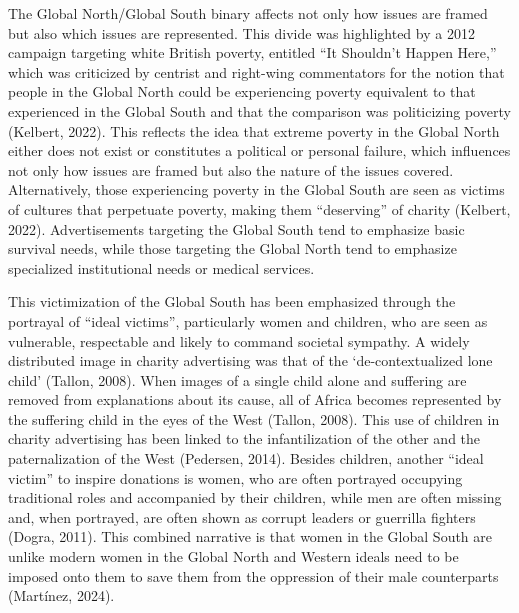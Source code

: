 The Global North/Global South binary affects not only how issues are framed but also which issues are represented. This divide was highlighted by a 2012 campaign targeting white British poverty, entitled “It Shouldn’t Happen Here,” which was criticized by centrist and right-wing commentators for the notion that people in the Global North could be experiencing poverty equivalent to that experienced in the Global South and that the comparison was politicizing poverty (Kelbert, 2022). This reflects the idea that extreme poverty in the Global North either does not exist or constitutes a political or personal failure, which influences not only how issues are framed but also the nature of the issues covered. Alternatively, those experiencing poverty in the Global South are seen as victims of cultures that perpetuate poverty, making them “deserving” of charity (Kelbert, 2022). Advertisements targeting the Global South tend to emphasize basic survival needs, while those targeting the Global North tend to emphasize specialized institutional needs or medical services.

This victimization of the Global South has been emphasized through the portrayal of “ideal victims”, particularly women and children, who are seen as vulnerable, respectable and likely to command societal sympathy. A widely distributed image in charity advertising was that of the ‘de-contextualized lone child’ (Tallon, 2008). When images of a single child alone and suffering are removed from explanations about its cause, all of Africa becomes represented by the suffering child in the eyes of the West (Tallon, 2008). This use of children in charity advertising has been linked to the infantilization of the other and the paternalization of the West (Pedersen, 2014). Besides children, another “ideal victim” to inspire donations is women, who are often portrayed occupying traditional roles and accompanied by their children, while men are often missing and, when portrayed, are often shown as corrupt leaders or guerrilla fighters (Dogra, 2011). This combined narrative is that women in the Global South are unlike modern women in the Global North and Western ideals need to be imposed onto them to save them from the oppression of their male counterparts (Martínez, 2024).  

